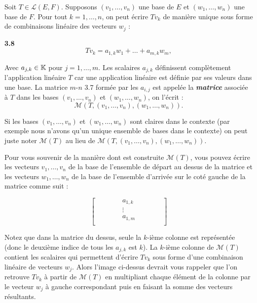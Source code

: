 \documentclass[12pt]{book}
\begin{document}
Soit $T\in\mathcal{L}(E,F)$. Supposons $(v_1,\ldots,v_n)$ une base de $E$ et $(w_1,\ldots,w_n)$ une base de $F$. Pour tout $k=1,\ldots,n$, on peut écrire $Tv_k$ de manière unique sous forme de combinaisons linéaire des vecteurs $w_j$ :



\textbf{3.8}
\begin{equation*}
    Tv_k=a_{1,k}w_1+\ldots+a_{m,k}w_m,
\end{equation*}

Avec $a_{j,k}\in\mathbb{K}$ pour $j=1,\ldots,m$. Les scalaires $a_{j,k}$ définissent complètement l'application linéaire $T$ car une application linéaire est définie par ses valeurs dans une base. La matrice $m$-$n$ 3.7 formée par les $a_{i,j}$ est appelée la \textbf{\textit{matrice}} associée à $T$ dans les bases $(v_1,\ldots,v_n)$ et $(w_1,\ldots,w_n)$, on l'écrit :
\begin{equation*}
    \mathcal{M}(T,(v_1,\ldots,v_n),(w_1,\ldots,w_n)).
\end{equation*}

Si les bases $(v_1,\ldots,v_n)$ et $(w_1,\ldots,w_n)$ sont claires dans le contexte (par exemple nous n'avons qu'un unique ensemble de bases dans le contexte) on peut juste noter $\mathcal{M}(T)$ au lieu de $\mathcal{M}(T,(v_1,\ldots,v_n),(w_1,\ldots,w_n))$.

Pour vous souvenir de la manière dont est construite $\mathcal{M}(T)$, vous pouvez écrire les vecteurs $v_1,\ldots,v_n$ de la base de l'ensemble de départ au dessus de la matrice et les vecteurs $w_1,\ldots,w_n$ de la base de l'ensemble d'arrivée sur le coté gauche de la matrice comme suit :

\begin{center}
\begin{equation*}\begin{bmatrix}
    \quad &\quad &a_{1,k} & \quad & \quad \\
    & &\vdots & &\\
    & & a_{1,m} & &\\
\end{bmatrix}\end{equation*}
\end{center}

Notez que dans la matrice du dessus, seule la $k$-ième colonne est représentée (donc le deuxième indice de tous les $a_{j,k}$ est $k$). La $k$-ième colonne de $\mathcal{M}(T)$ contient les scalaires qui permettent d'écrire $Tv_k$ sous forme d'une combinaison linéaire de vecteurs $w_j$. Alors l'image ci-dessus devrait vous rappeler que l'on retrouve $Tv_k$ à partir de $\mathcal{M}(T)$ en multipliant chaque élément de la colonne par le vecteur $w_j$ à gauche correspondant puis en faisant la somme des vecteurs résultants.
\end{document}
